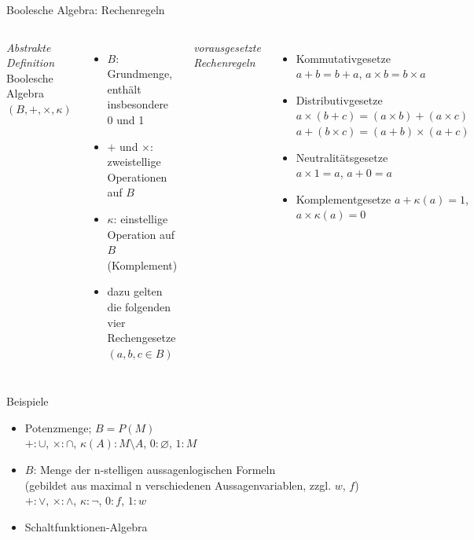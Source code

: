 \begin{frame}{Boolesche Algebra: Rechenregeln}
	\begin{columns}
		\emph{Abstrakte Definition}\\
		Boolesche Algebra $(B, +, \times, \kappa)$
		\begin{itemize}
			\item $B$: Grundmenge, enthält insbesondere 0 und 1
			\item $+$ und $\times$: zweistellige Operationen auf $B$
			\item $\kappa$: einstellige Operation auf $B$ (Komplement)
			\item dazu gelten die folgenden vier Rechengesetze $(a,b,c\in B)$
		\end{itemize}
		\emph{vorausgesetzte Rechenregeln}\\
		\begin{itemize}
			\item Kommutativgesetze\\
				$a+b=b+a$, $a \times b=b \times a$
			\item Distributivgesetze\\
				$a \times (b + c) = (a \times b) + (a\times c)$\\
				$a + (b \times c) = (a + b) \times (a + c)$\\
			\item Neutralitätsgesetze\\
				$a \times 1 = a$, $a + 0 = a$
			\item Komplementgesetze
				$a + \kappa(a) = 1$, $a \times \kappa(a) = 0$
		\end{itemize}
	\end{columns}		
\end{frame}


\begin{frame}{Beispiele}
	\begin{itemize}
		\item Potenzmenge; $B=P(M)$\\
			$+:\cup$, $\times:\cap$, $\kappa(A):M\setminus A$, $0:\varnothing$, $1:M$
		\item $B$: Menge der n-stelligen aussagenlogischen Formeln\\
			(gebildet aus maximal n verschiedenen Aussagenvariablen, zzgl. $w$, $f$)\\
			$+:\lor$, $\times:\land$, $\kappa:\neg$, $0:f$, $1:w$
		\item Schaltfunktionen-Algebra
	\end{itemize}
\end{frame}

